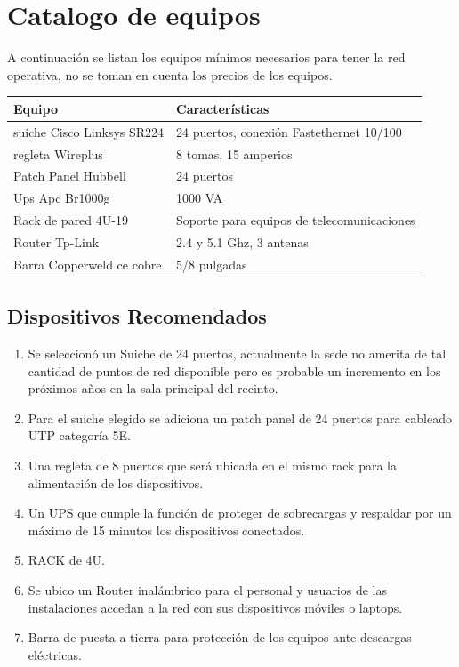 \documentclass[11pt, a4paper, twosides]{report}
\begin{document}
\chapter{Catalogo de equipos}
A continuación se listan los equipos mínimos necesarios para tener la red operativa, no se toman en cuenta los precios de los equipos. 
\begin{table}[h]
    \centering
    \begin{tabu}{|C{5cm}|C{5cm}|}
        \hline {} \textbf{Equipo}  &   \textbf{Características} \\
         \hline suiche Cisco Linksys SR224 &   24 puertos, conexión Fastethernet 10/100\\
         \hline regleta  Wireplus & 8 tomas, 15 amperios \\
         \hline Patch Panel Hubbell & 24 puertos\\
         \hline Ups Apc Br1000g  & 1000 VA\\
         \hline Rack de pared 4U-19 & Soporte para equipos de telecomunicaciones\\
         \hline Router Tp-Link & 2.4 y 5.1 Ghz, 3 antenas\\
         \hline Barra Copperweld ce cobre & 5/8 pulgadas\\
         \hline 
    \end{tabu}
\end{table}

\section{Dispositivos Recomendados}
\begin{enumerate}

\item Se seleccionó un Suiche de 24 puertos, actualmente la sede no amerita de tal cantidad de puntos de red disponible pero es probable un incremento en los próximos años en la sala principal del recinto.
\item Para el suiche elegido se adiciona un patch panel de 24 puertos para cableado UTP categoría 5E.
\item Una regleta  de 8 puertos que será ubicada en el mismo rack para la alimentación de los dispositivos.
\item Un UPS que cumple la función de proteger  de sobrecargas y respaldar por un máximo de 15 minutos los dispositivos conectados.
\item RACK de 4U.
\item Se ubico un Router inalámbrico para el personal y usuarios de las instalaciones accedan a la red con sus dispositivos móviles o laptops.
\item Barra de puesta a tierra para protección de los equipos ante descargas eléctricas.
\end{enumerate}
\clearpage
\renewcommand*{\bibfont}{\scriptsize}
\pagestyle{plain}
\printbibliography
\end{document}
